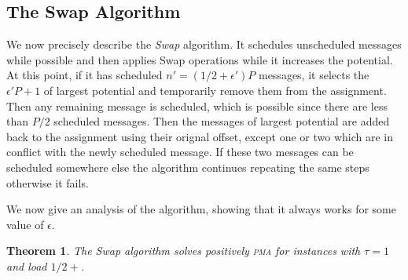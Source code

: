 \documentclass[10pt, conference, letterpaper]{IEEEtran}
\newtheorem{theorem}{Theorem}
\newcommand\pma{\textsc{pma}\xspace}
\begin{document}
\subsection{The Swap Algorithm}


We now precisely describe the \emph{Swap} algorithm. It schedules unscheduled messages while possible and then applies Swap operations while it increases the potential. At this point, if it has scheduled $n' = (1/2 + \epsilon')P$ messages, it selects the $\epsilon'P + 1$ of largest potential and temporarily remove them from the assignment. Then any remaining message is scheduled, which is possible since there are less than $P/2$ scheduled messages. Then the messages of largest potential are added back to the assignment using their orignal offset, except one or two which are in conflict with the newly scheduled message. If these two messages can be scheduled somewhere else the algorithm continues repeating the same steps otherwise it fails. 

We now give an analysis of the algorithm, showing that it always works for some value of $\epsilon$. 

\begin{theorem}
The Swap algorithm solves positively \pma for instances with $\tau =1$ and load $1/2 + $.
\end{theorem}
\end{document}
